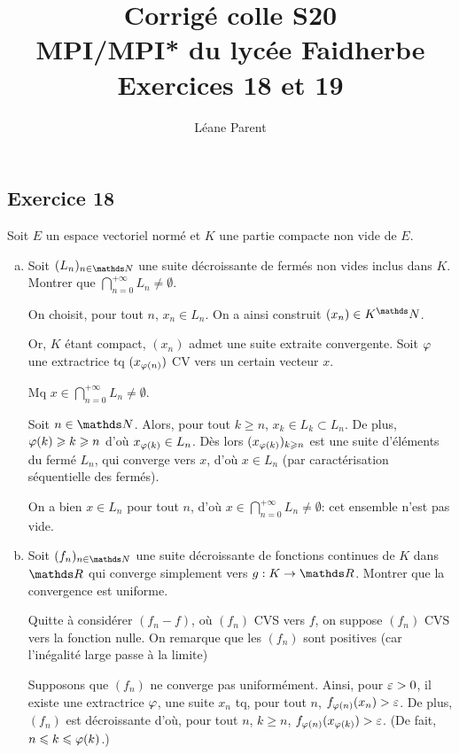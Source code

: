 \documentclass[a4paper, 12pt]{article}
\title{Corrigé colle S20 \\ MPI/MPI* du lycée Faidherbe \\ \large{Exercices 18 et 19}}
\author{Léane Parent}
\begin{document}
	\maketitle
	
	\subsection*{Exercice 18}
	Soit $E$ un espace vectoriel normé et $K$ une partie compacte non vide de $E$.
	\begin{enumerate}[a)]
		\item Soit $(L_n)_{n\in\N}$ une suite décroissante de fermés non vides inclus dans $K$. Montrer que $\displaystyle \bigcap_{n=0}^{+\infty}L_n \not = \emptyset$.
		\begin{corr}
			On choisit, pour tout $n$, $x_n \in L_n$. On a ainsi construit $(x_n) \in K^\N$.
			
			Or, $K$ étant compact, $(x_n)$ admet une suite extraite convergente. Soit $\varphi$ une extractrice tq $(x_{\varphi(n)})$ CV vers un certain vecteur $x$.
			
			Mq $x \in \displaystyle \bigcap_{n=0}^{+\infty}L_n \not = \emptyset$.
			
			Soit $n \in \N$. Alors, pour tout $k \geqslant n$, $x_k\in L_k \subset L_n$. De plus, $\varphi(k)\geqslant k \geqslant n$ d'où $x_{\varphi(k)} \in L_n$. Dès lors $(x_{\varphi(k)})_{k\geqslant n}$ est une suite d'éléments du fermé $L_n$, qui converge vers $x$, d'où $x\in L_n$ (par caractérisation séquentielle des fermés).
			
			On a bien $x\in L_n$ pour tout $n$, d'où $x \in \displaystyle \bigcap_{n=0}^{+\infty}L_n \not = \emptyset$: cet ensemble n'est pas vide.
		\end{corr}
		
		\item Soit $(f_n)_{n\in\N}$ une suite décroissante de fonctions continues de $K$ dans $\R$ qui converge simplement vers $g: K \rightarrow \R$. Montrer que la convergence est uniforme.
		
		\begin{corr}
			Quitte à considérer $(f_n - f)$, où $(f_n)$ CVS vers $f$, on suppose $(f_n)$ CVS vers la fonction nulle. On remarque que les $(f_n)$ sont positives (car l'inégalité large passe à la limite)
			
			Supposons que $(f_n)$ ne converge pas uniformément. Ainsi, pour $\varepsilon>0$, il existe une extractrice $\varphi$, une suite $x_n$ tq, pour tout $n$, $f_{\varphi(n)}(x_n) > \varepsilon$. De plus, $(f_n)$ est décroissante d'où, pour tout $n$, $k\geqslant n$, $f_{\varphi(n)}(x_{\varphi(k)}) > \varepsilon$. (De fait, $n \leqslant k \leqslant \varphi(k)$.)
			

\end{corr}
\end{enumerate}
\end{document}
